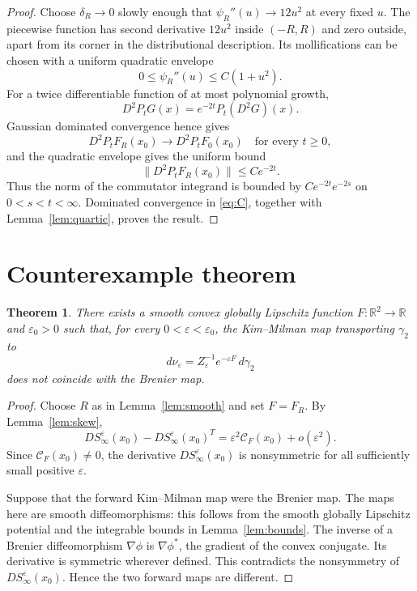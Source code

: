 \documentclass[11pt]{article}
\newtheorem{theorem}{Theorem}
\newcommand{\R}{\mathbb R}
\newcommand{\Hess}{D^2}
\begin{document}
\begin{proof}
Choose $\delta_R\to0$ slowly enough that $\psi_R''(u)\to12u^2$ at every
fixed $u$.  The piecewise function has second derivative $12u^2$ inside
$(-R,R)$ and zero outside, apart from its corner in the distributional
description.  Its mollifications can be chosen with a uniform quadratic
envelope
\[
 0\leq\psi_R''(u)\leq C(1+u^2).
\]
For a twice differentiable function of at most polynomial growth,
\[
 \Hess P_tG(x)=e^{-2t}P_t(\Hess G)(x).
\]
Gaussian dominated convergence hence gives
\[
 \Hess P_tF_R(x_0)\longrightarrow\Hess P_tF_0(x_0)
 \quad\text{for every }t\geq0,
\]
and the quadratic envelope gives the uniform bound
\[
 \lVert\Hess P_tF_R(x_0)\rVert\leq Ce^{-2t}.
\]
Thus the norm of the commutator integrand is bounded by
$Ce^{-2t}e^{-2s}$ on $0<s<t<\infty$.  Dominated convergence in
\eqref{eq:C}, together with Lemma~\ref{lem:quartic}, proves the result.
\end{proof}

\section{Counterexample theorem}

\begin{theorem}\label{thm:main}
There exists a smooth convex globally Lipschitz function
$F:\R^2\to\R$ and $\varepsilon_0>0$ such that, for every
$0<\varepsilon<\varepsilon_0$, the Kim--Milman map transporting $\gamma_2$
to
\[
 d\nu_\varepsilon=Z_\varepsilon^{-1}e^{-\varepsilon F}\,d\gamma_2
\]
does not coincide with the Brenier map.
\end{theorem}

\begin{proof}
Choose $R$ as in Lemma~\ref{lem:smooth} and set $F=F_R$.  By
Lemma~\ref{lem:skew},
\[
 DS_\infty^\varepsilon(x_0)-DS_\infty^\varepsilon(x_0)^T
 =\varepsilon^2\mathcal C_F(x_0)+o(\varepsilon^2).
\]
Since $\mathcal C_F(x_0)\neq0$, the derivative
$DS_\infty^\varepsilon(x_0)$ is nonsymmetric for all sufficiently small
positive $\varepsilon$.

Suppose that the forward Kim--Milman map were the Brenier map.  The maps here
are smooth diffeomorphisms: this follows from the smooth globally Lipschitz
potential and the integrable bounds in Lemma~\ref{lem:bounds}.  The inverse of
a Brenier diffeomorphism $\nabla\phi$ is $\nabla\phi^*$, the gradient of the
convex conjugate. Its derivative is symmetric wherever defined.  This
contradicts the nonsymmetry of $DS_\infty^\varepsilon(x_0)$. Hence the two
forward maps are different.
\end{proof}
\end{document}
